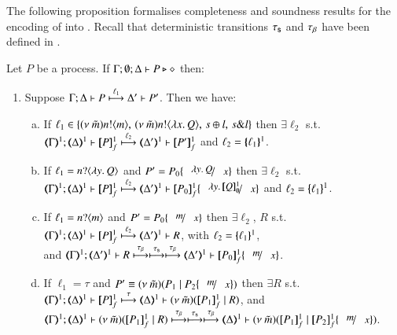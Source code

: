 The following proposition formalises completeness and
soundness results for the encoding of \HOp into \HO.
Recall that deterministic transitions $\tau_{\mathsf{s}}$ and 
$\tau_{\beta}$ have been defined in .

\begin{proposition}\myrm
	\label{prop:op_corr_HOp_to_HO}
	Let $P$ be a \HOp process.
	If $\Gamma; \emptyset; \Delta \vdash P \triangleright \diamond$ then:
%
	\begin{enumerate}[1.]
		\item
			Suppose $\Gamma; \Delta \vdash P \stackrel{\ell_1}{\longmapsto} \Delta' \vdash P'$. Then we have:
%
			\begin{enumerate}[a)]
				\item
					If $\ell_1 \in \{(\nu\ \tilde{m})n ! \langle m \rangle, \,(\nu\ \tilde{m})n ! \langle \lambda x.\,Q \rangle, \,s \oplus l, \,s \& l\}$
					then $\exists \ell_2$ s.t. \\
					$\horel{\tmap{\Gamma}{1}}{\tmap{\Delta}{1}}{\pmapp{P}{1}{f}}{\hby{\ell_2}}{\tmap{\Delta'}{1}}{\pmapp{P'}{1}{f}}$
					and $\ell_2 = \{\!\!\{\ell_1\}\!\!\}^{1}$.
			
				\item
					If $\ell_1 = n ? \langle \lambda y.\,Q \rangle$ and
					$P' = P_0 \subst{\abs{y}Q}{x}$
					then $\exists \ell_2$ s.t. \\
					$\horel{\tmap{\Gamma}{1}}{\tmap{\Delta}{1}}{\pmapp{P}{1}{f}}{\hby{\ell_2}}{\tmap{\Delta'}{1}}{\pmapp{P_0}{1}{f}\subst{\abs{y}\pmapp{Q}{1}{\emptyset}}{x}}$
					and $\ell_2 = \{\!\!\{\ell_1\}\!\!\}^{1}$.
			
				\item
					If $\ell_1 = n ? \langle m \rangle$
					and 
					$P' = P_0 \subst{m}{x}$
					then $\exists \ell_2$, $R$ s.t. \\
					$\horel{\tmap{\Gamma}{1}}{\tmap{\Delta}{1}}{\pmapp{P}{1}{f}}{\hby{\ell_2}}{\tmap{\Delta'}{1}}{R}$,
					with $\ell_2 = \{\!\!\{\ell_1\}\!\!\}^{1}$, \\
					and
					$\horel{\tmap{\Gamma}{1}}{\tmap{\Delta'}{1}}{R}{\hby{\btau} \hby{\stau} \hby{\btau}}
					{\tmap{\Delta'}{1}}{\pmapp{P_0}{1}{f}\subst{m}{x}}$.
						
				\item
					If $\ell_1 = \tau$
					and $P' \scong \newsp{\tilde{m}}{P_1 \Par P_2\subst{m}{x}}$
					then $\exists R$ s.t. \\
					$\horel{\tmap{\Gamma}{1}}{\tmap{\Delta}{1}}{\pmapp{P}{1}{f}}{\hby{\tau}}{\mapt{\Delta}^{1}}{\newsp{\tilde{m}}{\pmapp{P_1}{1}{f} \Par R}}$,
					and\\ 
					$\horel{\tmap{\Gamma}{1}}{\tmap{\Delta}{1}}{\newsp{\tilde{m}}{\pmapp{P_1}{1}{f} \Par R}}{\hby{\btau} \hby{\stau} \hby{\btau}}
					{\mapt{\Delta}^{1}}{\newsp{\tilde{m}}{\pmapp{P_1}{1}{f} \Par \pmapp{P_2}{1}{f}\subst{m}{x}}}$.
			

\end{enumerate}
\end{enumerate}
\end{proposition}
